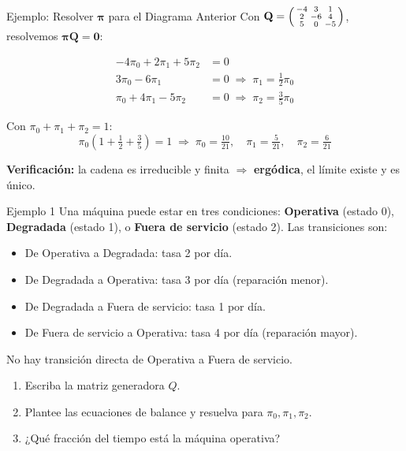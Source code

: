 \documentclass[aspectratio=1610, 10pt]{beamer}
\newcommand{\bpi}{\boldsymbol{\pi}}
\newcommand{\bQ}{\mathbf{Q}}
\begin{document}
\begin{frame}{Ejemplo: Resolver $\bpi$ para el Diagrama Anterior}
  Con $\bQ = \begin{psmallmatrix} -4 & 3 & 1 \\ 2 & -6 & 4 \\ 5 & 0 & -5 \end{psmallmatrix}$,
  resolvemos $\bpi\bQ = \mathbf{0}$:

  \vspace{4pt}
  \begin{align*}
    -4\pi_0 + 2\pi_1 + 5\pi_2 &= 0 \\
    3\pi_0 - 6\pi_1 &= 0 \;\Rightarrow\; \pi_1 = \tfrac{1}{2}\pi_0 \\
    \pi_0 + 4\pi_1 - 5\pi_2 &= 0 \;\Rightarrow\; \pi_2 = \tfrac{3}{5}\pi_0
  \end{align*}

  Con $\pi_0 + \pi_1 + \pi_2 = 1$:
  \[
    \pi_0\!\left(1 + \tfrac{1}{2} + \tfrac{3}{5}\right) = 1
    \;\Rightarrow\;
    \boxed{\pi_0 = \tfrac{10}{21},\quad \pi_1 = \tfrac{5}{21},\quad \pi_2 = \tfrac{6}{21}}
  \]

  \textbf{Verificaci\'{o}n:} la cadena es irreducible y finita $\Rightarrow$ \textbf{erg\'{o}dica}, el l\'{i}mite existe y es \'{u}nico.
\end{frame}

\begin{frame}{Ejemplo 1}
Una máquina puede estar en tres condiciones: \textbf{Operativa} (estado 0), \textbf{Degradada} (estado 1), o \textbf{Fuera de servicio} (estado 2). Las transiciones son:
\begin{itemize}
    \item De Operativa a Degradada: tasa 2 por día.
    \item De Degradada a Operativa: tasa 3 por día (reparación menor).
    \item De Degradada a Fuera de servicio: tasa 1 por día.
    \item De Fuera de servicio a Operativa: tasa 4 por día (reparación mayor).
\end{itemize}
No hay transición directa de Operativa a Fuera de servicio.

\begin{enumerate}
    \item Escriba la matriz generadora $Q$.
    \item Plantee las ecuaciones de balance y resuelva para $\pi_0, \pi_1, \pi_2$.
    \item ¿Qué fracción del tiempo está la máquina operativa?
    
\end{enumerate}

\end{frame}
\end{document}
